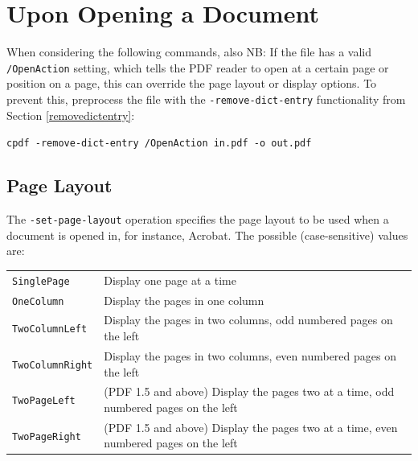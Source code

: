 \documentclass{book}
\begin{document}
\section{Upon Opening a Document}

\noindent When considering the following commands, also NB: If the file has a valid \texttt{/OpenAction} setting, which tells the PDF reader to open at a certain page or position on a page, this can override the page layout or display options. To prevent this, preprocess the file with the \texttt{-remove-dict-entry} functionality from Section \ref{removedictentry}:

  \begin{framed}
    \noindent\small\verb!cpdf -remove-dict-entry /OpenAction in.pdf -o out.pdf!
  \end{framed}

  \subsection{Page Layout}
  The \texttt{-set-page-layout} operation specifies the page layout to be used
when a document is opened in, for instance, Acrobat. The possible
(case-sensitive) values are:

\vspace{2mm}
  {\small\begin{tabular}{ll}
    \texttt{SinglePage} & \vspace{2mm} \parbox{8cm}{Display one page at a time} \\
    \texttt{OneColumn} & \vspace{2mm} \parbox{8cm}{Display the pages in one column} \\
    \texttt{TwoColumnLeft} & \vspace{2mm} \parbox{8cm}{Display the pages in two columns, odd numbered pages on the left} \\
    \texttt{TwoColumnRight} & \vspace{2mm} \parbox{8cm}{Display the pages in two columns, even numbered pages on the left} \\
    \texttt{TwoPageLeft} & \vspace{2mm} \parbox{8cm}{(PDF 1.5 and above) Display the pages two at a time, odd numbered pages on the left} \\
    \texttt{TwoPageRight} & \vspace{2mm} \parbox{8cm}{(PDF 1.5 and above) Display the pages two at a time, even numbered pages on the left}
  \end{tabular}}\\
\end{document}

